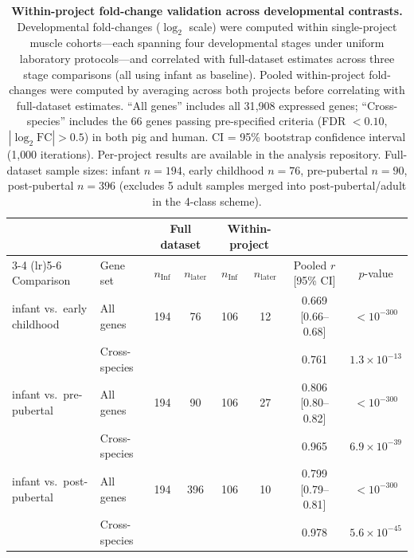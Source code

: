 \begin{table}[H]
  \centering
  \caption{\textbf{Within-project fold-change validation across developmental contrasts.} Developmental fold-changes ($\log_2$ scale) were computed within single-project muscle cohorts---each spanning four developmental stages under uniform laboratory protocols---and correlated with full-dataset estimates across three stage comparisons (all using infant as baseline). Pooled within-project fold-changes were computed by averaging across both projects before correlating with full-dataset estimates. ``All genes'' includes all 31{,}908 expressed genes; ``Cross-species'' includes the 66 genes passing pre-specified criteria (FDR $< 0.10$, $|\log_2\text{FC}| > 0.5$) in both pig and human. CI = 95\% bootstrap confidence interval (1{,}000 iterations). Per-project results are available in the analysis repository. Full-dataset sample sizes: infant $n = 194$, early childhood $n = 76$, pre-pubertal $n = 90$, post-pubertal $n = 396$ (excludes 5 adult samples merged into post-pubertal/adult in the 4-class scheme).}
  \label{tab:S5}
  \footnotesize
  \setlength{\tabcolsep}{4pt}
  \begin{tabular}{llcccccc}
    \toprule
    & & \multicolumn{2}{c}{Full dataset} & \multicolumn{2}{c}{Within-project} & & \\
    \cmidrule(lr){3-4} \cmidrule(lr){5-6}
    Comparison & Gene set & $n_{\text{Inf}}$ & $n_{\text{later}}$ & $n_{\text{Inf}}$ & $n_{\text{later}}$ & Pooled $r$ [95\% CI] & $p$-value \\
    \midrule
    infant vs.\ early childhood & All genes & 194 & 76 & 106 & 12 & 0.669 [0.66--0.68] & $< 10^{-300}$ \\
    & Cross-species & & & & & 0.761 & $1.3 \times 10^{-13}$ \\
    \midrule
    infant vs.\ pre-pubertal & All genes & 194 & 90 & 106 & 27 & 0.806 [0.80--0.82] & $< 10^{-300}$ \\
    & Cross-species & & & & & 0.965 & $6.9 \times 10^{-39}$ \\
    \midrule
    infant vs.\ post-pubertal & All genes & 194 & 396 & 106 & 10 & 0.799 [0.79--0.81] & $< 10^{-300}$ \\
    & Cross-species & & & & & 0.978 & $5.6 \times 10^{-45}$ \\
    \bottomrule
  \end{tabular}
\end{table}

